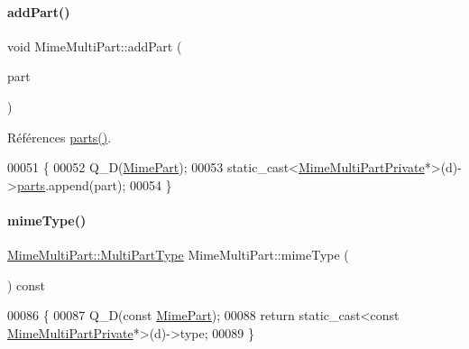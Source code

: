 \paragraph{\texorpdfstring{add\+Part()}{addPart()}}
{\footnotesize\ttfamily void Mime\+Multi\+Part\+::add\+Part (\begin{DoxyParamCaption}\item[{\hyperlink{class_simple_mail_1_1_mime_part}{Mime\+Part} $\ast$}]{part }\end{DoxyParamCaption})}



Références \hyperlink{class_simple_mail_1_1_mime_multi_part_afdfbaaa95c2cd5aa38c0078f1e6e6a38}{parts()}.


\begin{DoxyCode}
00051 \{
00052     Q\_D(\hyperlink{class_simple_mail_1_1_mime_part}{MimePart});
00053     \textcolor{keyword}{static\_cast<}\hyperlink{class_simple_mail_1_1_mime_multi_part_private}{MimeMultiPartPrivate}*\textcolor{keyword}{>}(d)->\hyperlink{class_simple_mail_1_1_mime_multi_part_afdfbaaa95c2cd5aa38c0078f1e6e6a38}{parts}.append(part);
00054 \}
\end{DoxyCode}
\mbox{\label{class_simple_mail_1_1_mime_multi_part_a4893232a5d10553a8c7200da60132c9e}} 
\paragraph{\texorpdfstring{mime\+Type()}{mimeType()}}
{\footnotesize\ttfamily \hyperlink{class_simple_mail_1_1_mime_multi_part_a6bef6836f893f87c64c4ff0cb9a93e53}{Mime\+Multi\+Part\+::\+Multi\+Part\+Type} Mime\+Multi\+Part\+::mime\+Type (\begin{DoxyParamCaption}{ }\end{DoxyParamCaption}) const}


\begin{DoxyCode}
00086 \{
00087     Q\_D(\textcolor{keyword}{const} \hyperlink{class_simple_mail_1_1_mime_part}{MimePart});
00088     \textcolor{keywordflow}{return} \textcolor{keyword}{static\_cast<}\textcolor{keyword}{const }\hyperlink{class_simple_mail_1_1_mime_multi_part_private}{MimeMultiPartPrivate}*\textcolor{keyword}{>}(d)->type;
00089 \}
\end{DoxyCode}
\mbox{\label{class_simple_mail_1_1_mime_multi_part_afdfbaaa95c2cd5aa38c0078f1e6e6a38}} 
